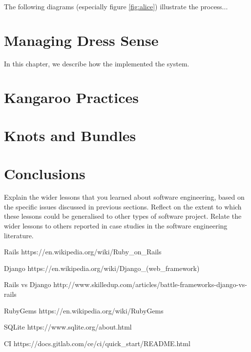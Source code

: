 \documentclass{l3proj}
\begin{document}
The following diagrams (especially figure \ref{fig:alice}) illustrate the
process...

\section{Managing Dress Sense}
\label{managing}

In this chapter, we describe how the implemented the system.

\section{Kangaroo Practices}



\section{Knots and Bundles}
\label{sec:managing}


\section{Conclusions}

Explain the wider lessons that you learned about software engineering,
based on the specific issues discussed in previous sections.  Reflect
on the extent to which these lessons could be generalised to other
types of software project.  Relate the wider lessons to others
reported in case studies in the software engineering literature.




\label{tech}
Rails
https://en.wikipedia.org/wiki/Ruby_on_Rails

Django
https://en.wikipedia.org/wiki/Django_(web_framework)

Rails vs Django
http://www.skilledup.com/articles/battle-frameworks-django-vs-rails

RubyGems
https://en.wikipedia.org/wiki/RubyGems

SQLite
https://www.sqlite.org/about.html

\label{testing}
CI 
https://docs.gitlab.com/ce/ci/quick_start/README.html
\end{document}
